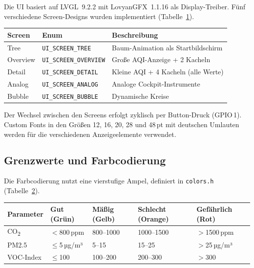Die UI basiert auf LVGL~9.2.2 mit LovyanGFX~1.1.16 als Display-Treiber. Fünf verschiedene Screen-Designs wurden implementiert (Tabelle~\ref{tab:screens}).

\begin{table}[htb]
\centering
\renewcommand{\arraystretch}{1.3}
\label{tab:screens}
\begin{tabular}{l l p{7cm}}
\toprule
\rowcolor{tableheader}
\textbf{Screen} & \textbf{Enum} & \textbf{Beschreibung} \\
\midrule
Tree & \texttt{UI\_SCREEN\_TREE} & Baum-Animation als Startbildschirm \\
Overview & \texttt{UI\_SCREEN\_OVERVIEW} & Große AQI-Anzeige + 2 Kacheln \\
Detail & \texttt{UI\_SCREEN\_DETAIL} & Kleine AQI + 4 Kacheln (alle Werte) \\
Analog & \texttt{UI\_SCREEN\_ANALOG} & Analoge Cockpit-Instrumente \\
Bubble & \texttt{UI\_SCREEN\_BUBBLE} & Dynamische Kreise \\
\bottomrule
\end{tabular}
\end{table}

Der Wechsel zwischen den Screens erfolgt zyklisch per Button-Druck (GPIO\,1). Custom Fonts in den Größen 12, 16, 20, 28 und 48\,pt mit deutschen Umlauten werden für die verschiedenen Anzeigeelemente verwendet.

\subsection{Grenzwerte und Farbcodierung}

Die Farbcodierung nutzt eine vierstufige Ampel, definiert in \texttt{colors.h} (Tabelle~\ref{tab:thresholds}).

\begin{table}[htb]
\centering
\renewcommand{\arraystretch}{1.3}
\label{tab:thresholds}
\begin{tabular}{l l l l l}
\toprule
\rowcolor{tableheader}
\textbf{Parameter} & \textbf{Gut (Grün)} & \textbf{Mäßig (Gelb)} & \textbf{Schlecht (Orange)} & \textbf{Gefährlich (Rot)} \\
\midrule
CO\textsubscript{2} & $<$800\,ppm & 800--1000 & 1000--1500 & $>$1500\,ppm \\
PM2.5 & $\leq$5\,µg/m³ & 5--15 & 15--25 & $>$25\,µg/m³ \\
VOC-Index & $\leq$100 & 100--200 & 200--300 & $>$300 \\
\bottomrule
\end{tabular}
\end{table}

